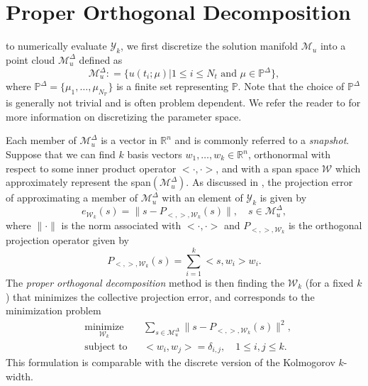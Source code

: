 \section{Proper Orthogonal Decomposition} \label{sec:3.2}
to numerically evaluate $\mathcal Y_k$, we first discretize the solution manifold $\mathcal M_{u}$ into a point cloud $\mathcal M_{u}^{\Delta}$ defined as
\begin{equation} \label{eq:3.7}
	\mathcal M_{u}^{\Delta} : = \{ u(t_i;\mu) |  1\leq i \leq N_t \text{ and } \mu \in \mathbb P^{\Delta} \},
\end{equation}
where $\mathbb P^{\Delta} = \{ \mu_{1} , \dots , \mu_{N_{\mathbb P}} \}$ is a finite set representing $\mathbb P$. Note that the choice of $\mathbb P^{\Delta}$ is generally not trivial and is often problem dependent. We refer the reader to \cite{quarteroni2015reduced} for more information on discretizing the parameter space.

Each member of $\mathcal M_{u}^{\Delta}$ is a vector in $\mathbb R^{n}$ and is commonly referred to a \emph{snapshot}. Suppose that we can find $k$ basis vectors $w_1,\dots,w_k\in \mathbb R^{n}$, orthonormal with respect to some inner product operator $<\cdot,\cdot>$, and with a span space $\mathcal W$ which approximately represent the span$(\mathcal M_u^\Delta)$. As discussed in , the projection error of approximating a member of $\mathcal M_{u}^{\Delta}$ with an element of $\mathcal Y_k$ is given by
\begin{equation} \label{eq:3.8}
	e_{\mathcal W_k}(s) = \| s - P_{<,>,\mathcal W_k}(s) \|, \quad s\in \mathcal M_u^{\Delta},
\end{equation}
where $\| \cdot \|$ is the norm associated with $<\cdot,\cdot>$ and $P_{<,>,\mathcal W_k}$ is the orthogonal projection operator given by
\begin{equation} \label{eq:3.9}
	P_{<,>,\mathcal W_k}(s) = \sum_{i=1}^k <s,w_i> w_i.
\end{equation}
The \emph{proper orthogonal decomposition} method is then finding the $\mathcal W_k$ (for a fixed $k$) that minimizes the collective projection error, and corresponds to the minimization problem
\begin{equation} \label{eq:3.10}
\begin{aligned}
&  \underset{\mathcal W_k}{\text{minimize}}
& & \sum_{s\in \mathcal M_u^{\Delta}} \| s - P_{<,>,\mathcal W_k} (s)\|^2, \\
& \text{subject to}
& & <w_i,w_j> = \delta_{i,j}, \quad 1\leq i,j \leq k.
\end{aligned}
\end{equation}
This formulation is comparable with the discrete version of the Kolmogorov $k$-width. 
